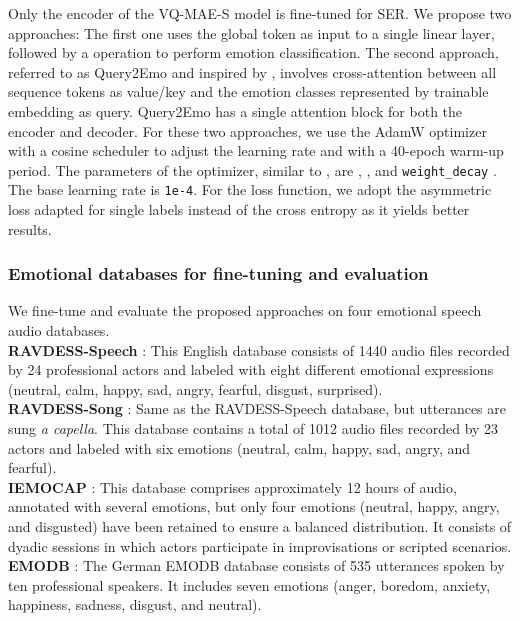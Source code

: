 \documentclass{article}
\begin{document}
Only the encoder of the VQ-MAE-S model is fine-tuned for SER. We propose two approaches: The first one uses the global token  as input to a single linear layer, followed by a  operation to perform emotion classification.
The second approach, referred to as Query2Emo and inspired by \cite{liu2021query2label}, involves cross-attention between all sequence tokens as value/key and the emotion classes represented by trainable embedding as query. Query2Emo has a single attention block for both the encoder and decoder. For these two approaches, we use the AdamW optimizer \cite{loshchilov2017decoupled} with a cosine scheduler to adjust the learning rate and with a 40-epoch warm-up period. The parameters of the optimizer, similar to \cite{he2022masked}, are , , and \texttt{weight\_decay} . The base learning rate is \texttt{1e-4}. For the loss function, we adopt the asymmetric loss \cite{ridnik2021asymmetric} adapted for single labels instead of the cross entropy as it yields better results. 

\subsubsection{Emotional databases for fine-tuning and evaluation}

We fine-tune and evaluate the proposed approaches on four emotional speech audio databases.\\
\textbf{RAVDESS-Speech} \cite{livingstone2018ryerson}: This English database consists of 1440 audio files recorded by 24 professional actors and labeled with eight different emotional expressions (neutral, calm, happy, sad, angry, fearful, disgust, surprised). \\
\textbf{RAVDESS-Song} \cite{livingstone2018ryerson}: Same as the RAVDESS-Speech database, but utterances are sung \textit{a capella}. This database contains a total of 1012 audio files recorded by 23 actors and labeled with six emotions (neutral, calm, happy, sad, angry, and fearful). \\
\textbf{IEMOCAP} \cite{busso2008iemocap}: This database comprises approximately 12 hours of audio, annotated with several emotions, but only four emotions (neutral, happy, angry, and disgusted) have been retained to ensure a balanced distribution. It consists of dyadic sessions in which actors participate in improvisations or scripted scenarios.\\
\textbf{EMODB} \cite{burkhardt2005database}: The German EMODB database consists of 535 utterances spoken by ten professional speakers. It includes seven emotions (anger, boredom, anxiety, happiness, sadness, disgust, and neutral). 
\end{document}
